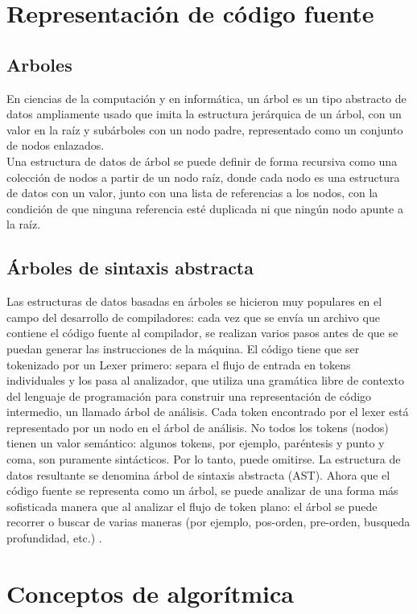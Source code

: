 \section{Representación de código fuente}

\subsection{Arboles}
En ciencias de la computación y en informática, un árbol es un tipo abstracto de datos ampliamente usado que imita la estructura jerárquica de un árbol, con un valor en la raíz y subárboles con un nodo padre, representado como un conjunto de nodos enlazados.\\
Una estructura de datos de árbol se puede definir de forma recursiva como una colección de nodos a partir de un nodo raíz, donde cada nodo es una estructura de datos con un valor, junto con una lista de referencias a los nodos, con la condición de que ninguna referencia esté duplicada ni que ningún nodo apunte a la raíz.

\subsection{Árboles de sintaxis abstracta}
Las estructuras de datos basadas en árboles se hicieron muy populares en el campo del desarrollo de compiladores: cada vez que se envía un archivo que contiene el código fuente al compilador, se realizan varios pasos antes de que se puedan generar las instrucciones de la máquina. El código tiene que ser tokenizado por un Lexer primero: separa el flujo de entrada en tokens individuales y los pasa al analizador, que utiliza una gramática libre de contexto del lenguaje de programación para construir una representación de código intermedio, un llamado árbol de análisis.
Cada token encontrado por el lexer está representado por un nodo en el árbol de análisis. No todos los tokens (nodos) tienen un valor semántico: algunos tokens, por ejemplo, paréntesis y punto y coma, son puramente sintácticos. Por lo tanto, puede omitirse. La estructura de datos resultante se denomina árbol de sintaxis abstracta (AST).
Ahora que el código fuente se representa como un árbol, se puede analizar de una forma más sofisticada manera que al analizar el flujo de token plano: el árbol se puede recorrer o buscar de varias maneras (por ejemplo, pos-orden, pre-orden, busqueda profundidad, etc.) \cite{ChangeDistiller}.


\section{Conceptos de algorítmica}
